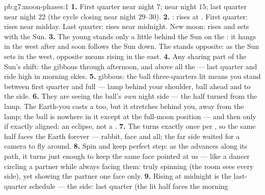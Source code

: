 \begin{solution}{pb:g7:moon-phases:1}
\textbf{1.} First quarter near night $7$;  near night
$15$; last quarter near night $22$ (the cycle closing near
night $29$--$30$).
\textbf{2.} : rises at . First quarter: rises
near midday. Last quarter: rises near midnight. New moon: rises
and sets with the Sun.
\textbf{3.} The young  stands only a little behind the
Sun on the : it hangs in the west after  and soon
follows the Sun down. The  stands opposite: as the Sun
sets in the west, opposite means rising in the east.
\textbf{4.} Any  sharing part of the Sun's shift: the
 gibbous through afternoon, and above all the 
 --- last quarter and   ride high in
morning skies.
\textbf{5.}  gibbous: the ball three-quarters lit means
you stand between first quarter and full --- lamp behind your
shoulder, ball ahead and to the side.
\textbf{6.} They are seeing the ball's \emph{own} night side ---
the half turned from the lamp. The Earth-you casts a  too,
but it stretches behind you, away from the lamp; the ball is
nowhere in it except at the full-moon position --- and then only
if exactly aligned: an eclipse, not a .
\textbf{7.} The  turns exactly once per , so the same
half faces the Earth forever --- rabbit, face and all; the far
side waited for a camera to fly around.
\textbf{8.} Spin and  keep perfect step: as the 
advances along its path, it turns just enough to keep the same
face pointed at us --- like a dancer circling a partner while
always facing them: truly spinning (the room sees every side),
yet showing the partner one face only.
\textbf{9.} Rising at midnight is the last-quarter schedule ---
the  side: last quarter (the lit half faces the morning

\end{solution}
